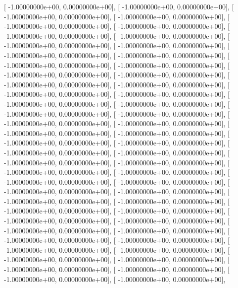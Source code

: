 \documentclass{article}
\begin{document}
       [ -1.00000000e+00,   0.00000000e+00],
       [ -1.00000000e+00,   0.00000000e+00],
       [ -1.00000000e+00,   0.00000000e+00],
       [ -1.00000000e+00,   0.00000000e+00],
       [ -1.00000000e+00,   0.00000000e+00],
       [ -1.00000000e+00,   0.00000000e+00],
       [ -1.00000000e+00,   0.00000000e+00],
       [ -1.00000000e+00,   0.00000000e+00],
       [ -1.00000000e+00,   0.00000000e+00],
       [ -1.00000000e+00,   0.00000000e+00],
       [ -1.00000000e+00,   0.00000000e+00],
       [ -1.00000000e+00,   0.00000000e+00],
       [ -1.00000000e+00,   0.00000000e+00],
       [ -1.00000000e+00,   0.00000000e+00],
       [ -1.00000000e+00,   0.00000000e+00],
       [ -1.00000000e+00,   0.00000000e+00],
       [ -1.00000000e+00,   0.00000000e+00],
       [ -1.00000000e+00,   0.00000000e+00],
       [ -1.00000000e+00,   0.00000000e+00],
       [ -1.00000000e+00,   0.00000000e+00],
       [ -1.00000000e+00,   0.00000000e+00],
       [ -1.00000000e+00,   0.00000000e+00],
       [ -1.00000000e+00,   0.00000000e+00],
       [ -1.00000000e+00,   0.00000000e+00],
       [ -1.00000000e+00,   0.00000000e+00],
       [ -1.00000000e+00,   0.00000000e+00],
       [ -1.00000000e+00,   0.00000000e+00],
       [ -1.00000000e+00,   0.00000000e+00],
       [ -1.00000000e+00,   0.00000000e+00],
       [ -1.00000000e+00,   0.00000000e+00],
       [ -1.00000000e+00,   0.00000000e+00],
       [ -1.00000000e+00,   0.00000000e+00],
       [ -1.00000000e+00,   0.00000000e+00],
       [ -1.00000000e+00,   0.00000000e+00],
       [ -1.00000000e+00,   0.00000000e+00],
       [ -1.00000000e+00,   0.00000000e+00],
       [ -1.00000000e+00,   0.00000000e+00],
       [ -1.00000000e+00,   0.00000000e+00],
       [ -1.00000000e+00,   0.00000000e+00],
       [ -1.00000000e+00,   0.00000000e+00],
       [ -1.00000000e+00,   0.00000000e+00],
       [ -1.00000000e+00,   0.00000000e+00],
       [ -1.00000000e+00,   0.00000000e+00],
       [ -1.00000000e+00,   0.00000000e+00],
       [ -1.00000000e+00,   0.00000000e+00],
       [ -1.00000000e+00,   0.00000000e+00],
       [ -1.00000000e+00,   0.00000000e+00],
       [ -1.00000000e+00,   0.00000000e+00],
       [ -1.00000000e+00,   0.00000000e+00],
       [ -1.00000000e+00,   0.00000000e+00],
       [ -1.00000000e+00,   0.00000000e+00],
       [ -1.00000000e+00,   0.00000000e+00],
       [ -1.00000000e+00,   0.00000000e+00],
       [ -1.00000000e+00,   0.00000000e+00],
       [ -1.00000000e+00,   0.00000000e+00],
       [ -1.00000000e+00,   0.00000000e+00],
       [ -1.00000000e+00,   0.00000000e+00],
       [ -1.00000000e+00,   0.00000000e+00],
\end{document}

